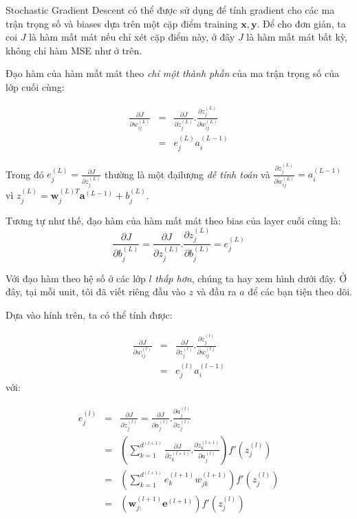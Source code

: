 Stochastic Gradient Descent có thể được sử dụng để tính gradient cho các ma trận trọng số và biases dựa trên một cặp điểm training $\mathbf{x, y}$. Để cho đơn giản, ta coi $J$ là hàm mất mát nếu chỉ xét cặp điểm này, ở đây $J$ là hàm mất mát bất kỳ, không chỉ hàm MSE như ở trên. 
 
Đạo hàm của hàm mất mát theo \textit{chỉ một thành phần} của ma trận trọng số của lớp cuối cùng: 
 
\begin{eqnarray} 
\frac{\partial J}{\partial w_{ij}^{(L)}} &=& \frac{\partial J}{\partial z_j^{(L)}}. \frac{\partial z_j^{(L)}}{\partial w_{ij}^{(L)}} \\\ 
&=& e_j^{(L)} a_i^{(L-1)} 
\end{eqnarray} 
 
Trong đó $e_j^{(L)} = \frac{\partial J}{\partial z_j^{(L)}} $ thường là một đạilượng \textit{dễ tính toán} và $\frac{\partial z_j^{(L)}}{\partial w_{ij}^{(L)}}  = a_i^{(L-1)}$ vì $z_j^{(L)} = \mathbf{w}_j^{(L)T}\mathbf{a}^{(L-1)} + b_j^{(L)}$. 
 
Tương tự như thế, đạo hàm của hàm mất mát theo bias của layer cuối cùng là: 
\begin{equation*} 
\frac{\partial J}{\partial b_{j}^{(L)}} = \frac{\partial J}{\partial z_j^{(L)}}. \frac{\partial z_j^{(L)}}{\partial b_{j}^{(L)}} = e_j^{(L)} 
\end{equation*} 
 
Với đạo hàm theo hệ số ở các lớp $l$ \textit{thấp hơn}, chúng ta hay xem hình dưới đây. Ở đây, tại mỗi unit, tôi đã viết riêng đầu vào $z$ và đầu ra $a$ để các bạn tiện theo dõi. 
 
Dựa vào hính trên, ta có thể tính được: 
 
\begin{eqnarray} 
\frac{\partial J}{\partial w_{ij}^{(l)}} &=& \frac{\partial J}{\partial z_j^{(l)}}. \frac{\partial z_j^{(l)}}{\partial w_{ij}^{(l)}} \\\ 
&=& e_j^{(l)} a_i^{(l-1)} 
\end{eqnarray} 
với: 
 
\begin{eqnarray} 
e_j^{(l)} &=& \frac{\partial J}{\partial z_j^{(l)}} = \frac{\partial J}{\partial a_j^{(l)}} . \frac{\partial a_j^{(l)}}{\partial z_j^{(l)}} \\\ 
&=& \left( \sum_{k = 1}^{d^{(l+1)}} \frac{\partial J}{\partial z_k^{(l+1)}} .\frac{\partial z_k^{(l+1)}}{\partial a_j^{(l)}} \right) f'(z_j^{(l)}) \\\ 
 &=&\left( \sum_{k = 1}^{d^{(l+1)}} e_k^{(l+1)} w_{jk}^{(l+1)} \right) f'(z_j^{(l)}) \\\ 
 &=&\left( \mathbf{w}_{j:}^{(l+1)} \mathbf{e}^{(l+1)} \right) f'(z_j^{(l)}) \\\ 
\end{eqnarray} 
 
